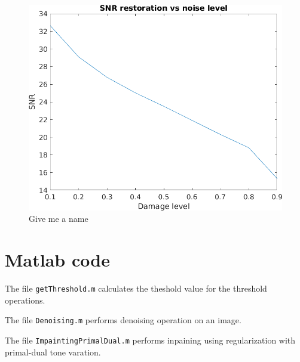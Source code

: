 \documentclass[a4paper,12pt]{article}
\begin{document}
\begin{figure}[t]
        \centering
        \includegraphics{../Results/Inpainting_lena_noise_vs_SNR.png}
        \caption{Give me a name} 
		\label{fig:nvssnr}
\end{figure}


\section{Matlab code}
The file \texttt{getThreshold.m} calculates the theshold value for the threshold operations.


\vspace{18pt}
\noindent The file \texttt{Denoising.m} performs denoising operation on an image.


\vspace{18pt} 
\noindent The file \texttt{ImpaintingPrimalDual.m} performs inpaining using regularization with primal-dual tone varation.

\end{document}
